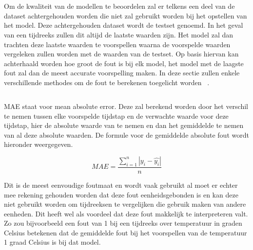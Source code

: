 \clearpage
\section{}

Om de kwaliteit van de modellen te beoordelen zal er telkens een deel van de dataset achtergehouden worden die niet zal gebruikt worden bij het opstellen van het model. Deze achtergehouden dataset wordt de testset genoemd. In het geval van een tijdreeks zullen dit altijd de laatste waarden zijn. Het model zal dan trachten deze laatste waarden te voorspellen waarna de voorspelde waarden vergeleken zullen worden met de waarden van de testset. Op basis hiervan kan achterhaald worden hoe groot de fout is bij elk model, het model met de laagste fout zal dan de meest accurate voorspelling maken. 
In deze sectie zullen enkele verschillende methodes om de fout te berekenen toegelicht worden ~\autocite{Hyndman2018}.

\subsection{}

\subsubsection{}
MAE staat voor mean absolute error. Deze zal berekend worden door het verschil te nemen tussen elke voorspelde tijdstap en de verwachte waarde voor deze tijdstap, hier de absolute waarde van te nemen en dan het gemiddelde te nemen van al deze absolute waarden. De formule voor de gemiddelde absolute fout wordt hieronder weergegeven.

\begin{equation}
MAE = \frac{\sum_{i=1}^{n} |y_i - \hat{y_i}|}{n}
\end{equation}

Dit is de meest eenvoudige foutmaat en wordt vaak gebruikt al moet er echter mee rekening gehouden worden dat deze fout eenheidsgebonden is en kan deze niet gebruikt worden om tijdreeksen te vergelijken die gebruik maken van andere eenheden. Dit heeft wel als voordeel dat deze fout makkelijk te interpreteren valt. Zo zou bijvoorbeeld een fout van 1 bij een tijdreeks over temperatuur in graden Celsius betekenen dat de gemiddelde fout bij het voorspellen van de temperatuur 1 graad Celsius is bij dat model.

